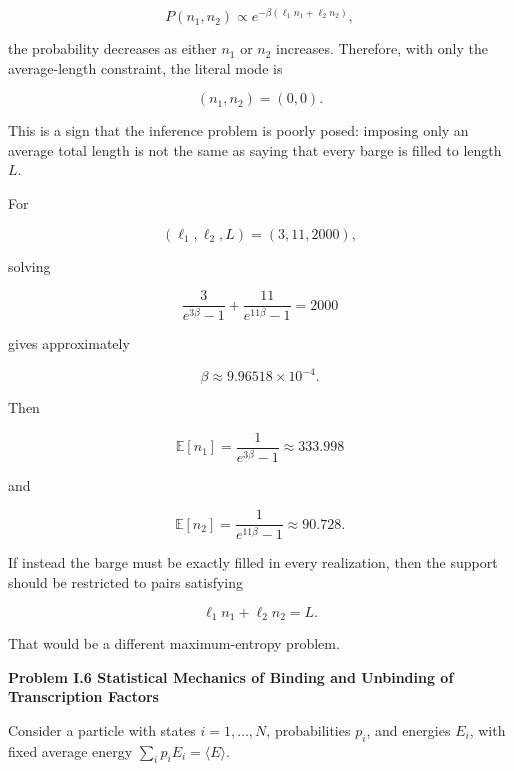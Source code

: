 \documentclass[11pt]{article}
\newcommand{\problem}[1]{%
    \vspace{1em}
    {\large\bfseries #1}
    \par
    \vspace{0.4em}
}
\newcommand{\E}{\mathbb{E}}
\begin{document}
\[
P(n_1,n_2)
\propto
e^{-\beta(\ell_1n_1+\ell_2n_2)},
\]

the probability decreases as either \(n_1\) or \(n_2\) increases. Therefore,
with only the average-length constraint, the literal mode is

\[
(n_1,n_2)=(0,0).
\]

This is a sign that the inference problem is poorly posed: imposing only an
average total length is not the same as saying that every barge is filled to
length \(L\).

For

\[
(\ell_1,\ell_2,L)=(3,11,2000),
\]

solving

\[
\frac{3}{e^{3\beta}-1}
+
\frac{11}{e^{11\beta}-1}
=
2000
\]

gives approximately

\[
\beta
\approx
9.96518\times10^{-4}.
\]

Then

\[
\E[n_1]
=
\frac{1}{e^{3\beta}-1}
\approx333.998
\]

and

\[
\E[n_2]
=
\frac{1}{e^{11\beta}-1}
\approx90.728.
\]

If instead the barge must be exactly filled in every realization, then the
support should be restricted to pairs satisfying

\[
\ell_1n_1+\ell_2n_2=L.
\]

That would be a different maximum-entropy problem.


\problem{Problem I.6 Statistical Mechanics of Binding and Unbinding of Transcription Factors}

Consider a particle with states \(i=1,\ldots,N\), probabilities \(p_i\), and
energies \(E_i\), with fixed average energy
\(\sum_i p_iE_i=\langle E\rangle\).
\end{document}
